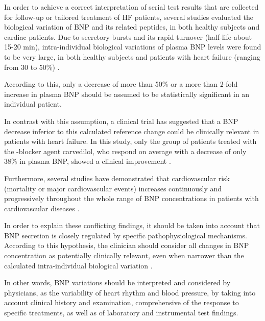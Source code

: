 \documentclass[14pt,a4paper,onecolumn]{extarticle}
\begin{document}
In order to achieve a correct interpretation of serial test results that are collected for follow-up or tailored treatment of HF patients, several studies evaluated the biological variation of BNP and its related peptides, in both healthy subjects and cardiac patients. Due to secretory bursts and its rapid turnover (half-life about 15-20 min), intra-individual biological variations of plasma BNP levels were found to be very large, in both healthy subjects and patients with heart failure (ranging from 30 to 50\%) \citep{bib399}.  %

According to this, only a decrease of more than 50\% or a more than 2-fold increase in plasma BNP should be assumed to be statistically significant in an individual patient.



In contrast with this assumption, a clinical trial \citep{bib390} has suggested that a BNP decrease inferior to this calculated reference change could be clinically relevant in patients with heart failure. In this study, only the group of patients treated with the \beta-blocker agent carvedilol, who respond on average with a decrease of only 38\% in plasma BNP, showed a clinical improvement \citep{bib390}.



Furthermore, several studies have demonstrated that cardiovascular risk (mortality or major cardiovascular events) increases continuously and progressively throughout the whole range of BNP concentrations in patients with cardiovascular diseases \citep{bib35} \citep{bib377} \citep{bib378} \citep{bib3194}.



In order to explain these conflicting findings, it should be taken into account that BNP secretion is closely regulated by specific pathophysiological mechanisms.  According to this hypothesis, the clinician should consider all changes in BNP concentration as potentially clinically relevant, even when narrower than the calculated intra-individual biological variation \citep{bib3103}.

In other words, BNP variations should be interpreted and considered by physicians, as the variability of heart rhythm and blood pressure, by taking into account clinical history and examination, comprehensive of the response to specific treatments, as well as of laboratory and instrumental test findings.
\end{document}
